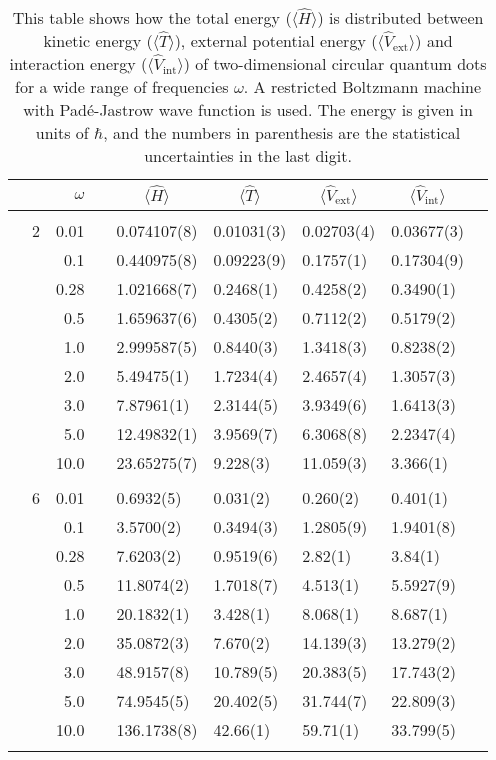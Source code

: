 \begin{table}[H]
	\caption{This table shows how the total energy ($\langle\hat{H}\rangle$) is distributed between kinetic energy ($\langle\hat{T}\rangle$), external potential energy ($\langle\hat{V}_{\text{ext}}\rangle$) and interaction energy ($\langle\hat{V}_{\text{int}}\rangle$) of two-dimensional circular quantum dots for a wide range of frequencies $\omega$. A restricted Boltzmann machine with Padé-Jastrow wave function is used. The energy is given in units of $\hbar$, and the numbers in parenthesis are the statistical uncertainties in the last digit.}
	\label{tab:splitfrequencyQDRBMPJ}
	\begin{tabularx}{\textwidth}{R{1cm}rrcR{2.3cm}R{2.3cm}R{2.3cm}R{2.3cm}R{1cm}} \hline\hline
		&\makecell{\\ \phantom{$N$} \\ \phantom{=}} & $\omega$ &&  &  &  &  & \\ \hline \\
		&2 & 0.01 && 0.074107(8) & 0.01031(3) & 0.02703(4) & 0.03677(3) \\
		&& 0.1 && 0.440975(8) & 0.09223(9) & 0.1757(1) & 0.17304(9) \\
		&& 0.28 && 1.021668(7) & 0.2468(1) & 0.4258(2) & 0.3490(1) \\
		&& 0.5 && 1.659637(6) & 0.4305(2) & 0.7112(2) & 0.5179(2) \\
		&& 1.0 && 2.999587(5) & 0.8440(3) & 1.3418(3) & 0.8238(2) \\
		&& 2.0 && 5.49475(1) & 1.7234(4) & 2.4657(4) & 1.3057(3) \\
		&& 3.0 && 7.87961(1) & 2.3144(5) & 3.9349(6) & 1.6413(3) \\
		&& 5.0 && 12.49832(1) & 3.9569(7) & 6.3068(8) & 2.2347(4) \\
		&& 10.0 && 23.65275(7) & 9.228(3) & 11.059(3) & 3.366(1) \\
		\hdashline \\
		
		&6 & 0.01 && 0.6932(5) & 0.031(2) & 0.260(2) & 0.401(1) \\
		&& 0.1 && 3.5700(2) & 0.3494(3) & 1.2805(9) & 1.9401(8) \\
		&& 0.28 && 7.6203(2) & 0.9519(6) & 2.82(1) & 3.84(1) \\
		&& 0.5 && 11.8074(2) & 1.7018(7) & 4.513(1) & 5.5927(9) \\
		&& 1.0 && 20.1832(1) & 3.428(1) & 8.068(1) & 8.687(1) \\
		&& 2.0 && 35.0872(3) & 7.670(2) & 14.139(3) & 13.279(2) \\
		&& 3.0 && 48.9157(8) & 10.789(5) & 20.383(5) & 17.743(2) \\ 
		&& 5.0 && 74.9545(5) & 20.402(5) & 31.744(7) & 22.809(3) \\
		&& 10.0 && 136.1738(8) & 42.66(1) & 59.71(1) & 33.799(5) \\
		\hdashline \\
		

\end{tabularx}
\end{table}
